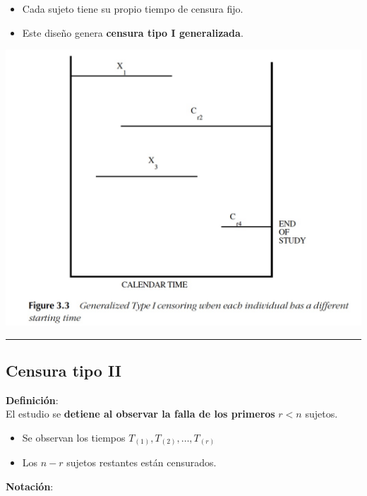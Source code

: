 \documentclass[
  letterpaper,
  DIV=11,
  numbers=noendperiod]{scrartcl}
\providecommand{\tightlist}{%
  \setlength{\itemsep}{0pt}\setlength{\parskip}{0pt}}
\begin{document}
\begin{itemize}
\tightlist
\item
  Cada sujeto tiene su propio tiempo de censura fijo.
\item
  Este diseño genera \textbf{censura tipo I generalizada}.
\end{itemize}

\begin{center}
\includegraphics[width=1\linewidth,height=\textheight,keepaspectratio]{figura/CensuraI-2.jpg}
\end{center}

\begin{center}\rule{0.5\linewidth}{0.5pt}\end{center}

\subsection{Censura tipo II}\label{censura-tipo-ii}

\textbf{Definición}:\\
El estudio se \textbf{detiene al observar la falla de los primeros}
\(r < n\) sujetos.

\begin{itemize}
\tightlist
\item
  Se observan los tiempos \(T_{(1)}, T_{(2)}, \dots, T_{(r)}\)
\item
  Los \(n - r\) sujetos restantes están censurados.
\end{itemize}

\textbf{Notación}:
\end{document}
